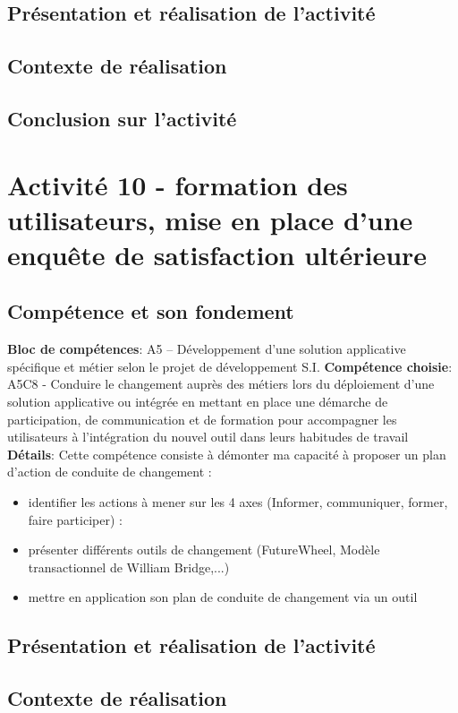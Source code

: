 \documentclass[a4paper, 11pt]{report}
\begin{document}
\subsection{Présentation et réalisation de l'activité}
\subsection{Contexte de réalisation}
\subsection{Conclusion sur l'activité}

\section{Activité 10 - formation des utilisateurs, mise en place d’une enquête de satisfaction ultérieure}
\subsection{Compétence et son fondement}
\textbf{Bloc de compétences}: A5 – Développement d’une solution applicative spécifique et métier selon le projet de développement S.I.
\newline
\textbf{Compétence choisie}: A5C8 - Conduire le changement auprès des métiers lors du déploiement d’une solution applicative ou intégrée en mettant en place une démarche de participation, de communication et de formation pour accompagner les utilisateurs à l’intégration du nouvel outil dans leurs habitudes de travail
\newline
\textbf{Détails}: Cette compétence consiste à démonter ma capacité à proposer un plan d’action de conduite de changement :
\begin{itemize}
  \item identifier les actions à mener sur les 4 axes (Informer, communiquer, former, faire participer) :
  \item présenter différents outils de changement (FutureWheel, Modèle transactionnel de William Bridge,...)
  \item mettre en application son plan de conduite de changement via un outil
\end{itemize}
\subsection{Présentation et réalisation de l'activité}
\subsection{Contexte de réalisation}
\end{document}
